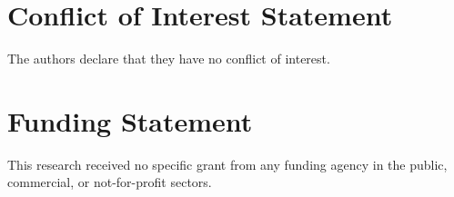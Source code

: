 \documentclass[12pt]{article}
\begin{document}
\section*{Conflict of Interest Statement}
The authors declare that they have no conflict of interest.

\section*{Funding Statement}
This research received no specific grant from any funding agency in the
public, commercial, or not-for-profit sectors.


\end{document}

